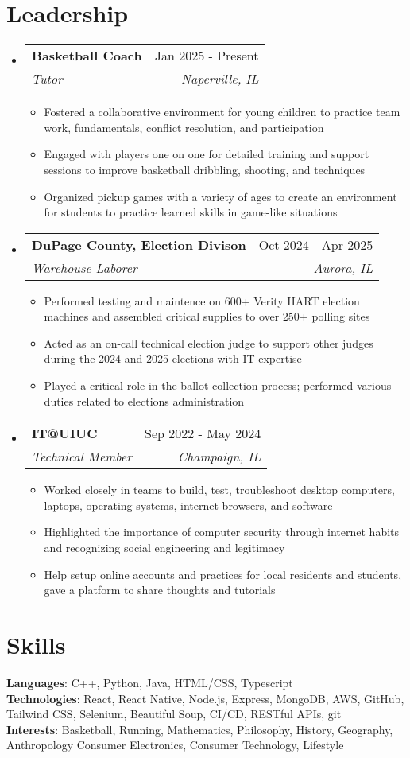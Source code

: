 \documentclass[letterpaper,11pt]{article}
\makeatletter
\newcommand{\resumeItem}[1]{
  \item\footnotesize{#1}
    {\vspace{-2pt}}
  }
\newcommand{\resumeSubheading}[4]{
  \vspace{-2pt}\item
    \begin{tabular*}{0.97\textwidth}[t]{l@{\extracolsep{\fill}}r}
      \textbf{\small#1} & \small#2 \\
      \textit{\footnotesize#3} & \textit{\footnotesize #4} \\
    \end{tabular*}\vspace{-7pt}
}
\newcommand{\resumeSubHeadingListStart}{\begin{itemize}[leftmargin=0.15in, label={}]}
\newcommand{\resumeSubHeadingListEnd}{\end{itemize}}
\newcommand{\resumeItemListStart}{\begin{itemize}[leftmargin=*]\vspace{-2pt}}
\newcommand{\resumeItemListEnd}{\end{itemize}\vspace{-5pt}}
\makeatother
\begin{document}
\section{Leadership}
  \resumeSubHeadingListStart

    \resumeSubheading
    {Basketball Coach}{Jan 2025 - Present}
    {Tutor}{Naperville, IL}
    \resumeItemListStart
      \resumeItem{Fostered a collaborative environment for young children to practice team work, fundamentals, conflict resolution, and participation}
      \resumeItem{Engaged with players one on one for detailed training and support sessions to improve basketball dribbling, shooting, and techniques}
      \resumeItem{Organized pickup games with a variety of ages to create an environment for students to practice learned skills in game-like situations}
  \resumeItemListEnd

    \resumeSubheading
    {DuPage County, Election Divison}{Oct 2024 - Apr 2025}
    {Warehouse Laborer}{Aurora, IL}
    \resumeItemListStart
      \resumeItem{Performed testing and maintence on 600+ Verity HART election machines and assembled critical supplies to over 250+ polling sites}
      \resumeItem{Acted as an on-call technical election judge to support other judges during the 2024 and 2025 elections with IT expertise}
      \resumeItem{Played a critical role in the ballot collection process; performed various duties related to elections administration}
  \resumeItemListEnd

    \resumeSubheading
    {IT@UIUC}{Sep 2022 - May 2024}
    {Technical Member}{Champaign, IL}
    \resumeItemListStart
      \resumeItem{Worked closely in teams to build, test, troubleshoot desktop computers, laptops, operating systems, internet browsers, and software}
      \resumeItem{Highlighted the importance of computer security through internet habits and recognizing social engineering and legitimacy}
      \resumeItem{Help setup online accounts and practices for local residents and students, gave a platform to share thoughts and tutorials}
  \resumeItemListEnd

\resumeSubHeadingListEnd

\section{Skills}
\begin{itemize}[leftmargin=0.15in, label={}]
   \footnotesize{\item{
    \textbf{Languages}{: C++, Python, Java, HTML/CSS, Typescript} \\
    \textbf{Technologies}{: React, React Native, Node.js, Express, MongoDB, AWS, GitHub, Tailwind CSS, Selenium, Beautiful Soup, CI/CD, RESTful APIs, git} \\
    \textbf{Interests}{: Basketball, Running, Mathematics, Philosophy, History, Geography, Anthropology Consumer Electronics, Consumer Technology, Lifestyle}
   }}
\end{itemize}
\end{document}
